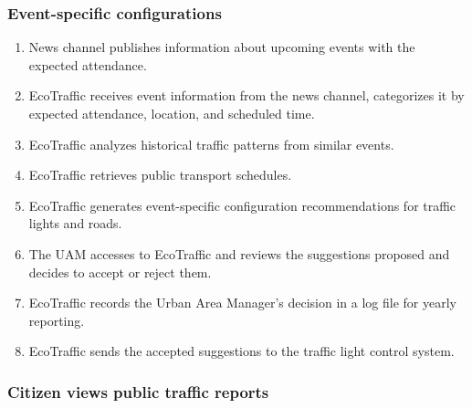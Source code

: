 \documentclass[12pt, a4paper, twoside, openright]{report}
\begin{document}
\subsubsection{Event-specific configurations}\label{subsubsec:event-specific}

\begin{enumerate}
\item
  News channel publishes information about upcoming events with the
  expected attendance.
\item
  EcoTraffic receives event information from the news channel, categorizes it by expected attendance, location, and scheduled time.
\item
  EcoTraffic analyzes historical traffic patterns from similar events.
\item
  EcoTraffic retrieves public transport schedules.
\item
  EcoTraffic generates event-specific configuration recommendations for
  traffic lights and roads.
\item
  The UAM accesses to EcoTraffic and reviews the suggestions proposed
  and decides to accept or reject them.
\item
  EcoTraffic records the Urban Area Manager's decision in a log file for yearly reporting.
\item
  EcoTraffic sends the accepted suggestions to the traffic light control system.
\end{enumerate}

\subsubsection{Citizen views public traffic reports}\label{subsubsec:citizen-views}
\end{document}
